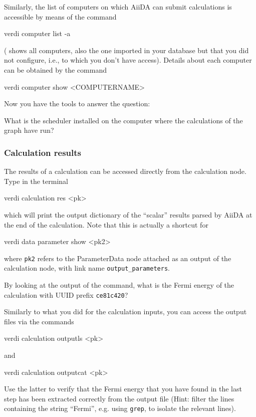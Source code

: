 Similarly, the list of computers on which AiiDA can submit calculations is accessible by means of the command
\begin{bashcommand}
verdi computer list -a
\end{bashcommand}
( shows all computers, also the one imported in your database but that you did not configure, i.e., to which you don't have access).
Details about each computer can be obtained by the command 
\begin{bashcommand}
verdi computer show <COMPUTERNAME>
\end{bashcommand}
Now you have the tools to answer the question:
\begin{tcolorbox}
What is the scheduler installed on the computer where the calculations of the graph have run?
\end{tcolorbox}


\subsubsection*{Calculation results}
The results of a calculation can be accessed directly from the calculation node. Type in the terminal
\begin{bashcommand}
verdi calculation res <pk>
\end{bashcommand}
which will print the output dictionary of the ``scalar'' results parsed by AiiDA at the end of the calculation.  Note that this is actually a shortcut for 
\begin{bashcommand}
verdi data parameter show <pk2>
\end{bashcommand}
where \texttt{pk2} refers to the ParameterData node attached as an output of the calculation node, with link name \texttt{output\_parameters}.

\begin{tcolorbox}
By looking at the output of the command, what is the Fermi energy of the calculation with UUID prefix \texttt{ce81c420}?
\end{tcolorbox}



Similarly to what you did for the calculation inputs, you can access the output files via the commands
\begin{bashcommand}
verdi calculation outputls <pk>
\end{bashcommand}
and
\begin{bashcommand}
verdi calculation outputcat <pk>
\end{bashcommand}
Use the latter to verify that the Fermi energy that you have found in the last step has been extracted correctly from the output file (Hint: filter the lines containing the string ``Fermi'', e.g. using \texttt{grep}, to isolate the relevant lines). 

